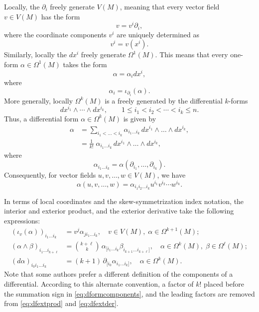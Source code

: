 \documentclass[12pt]{article}
\begin{document}
Locally, the $\partial_i$ freely generate $V(M)$, meaning
that every vector field $v\in V(M)$ has the form
\[ v= v^i \partial_i, \]
where the coordinate components $v^i$ are uniquely determined as
\[ v^i=v(x^i). \]
Similarly, locally the $dx^i$ freely generate $\Omega^1(M)$.  This
means that 
every
one-form $\alpha\in\Omega^1(M)$ takes the form
\[\alpha=\alpha_i dx^i,\]
where
\[\alpha_i=\iota_{\partial_i} (\alpha).\]
More generally, locally $\Omega^k(M)$ is a freely generated by the
differential $k$-forms
\[dx^{i_1}\wedge\cdots\wedge dx^{i_k},\qquad 1\leq
i_1<i_2<\cdots<i_k\leq n.\] Thus, a differential form $\alpha\in
\Omega^k(M)$ is given by
\begin{align}
  \label{eq:dformcomponents}
  \alpha &= \!\!\!\sum_{i_1< \ldots< i_k} \!\!\!\alpha_{i_1\ldots
    i_k}\, d x^{i_1} \wedge\ldots\wedge d x^ {i_k},\\ \nonumber
  &= \frac{1}{k!} \; \alpha_{i_1\ldots
    i_k}\, d x^{i_1} \wedge\ldots\wedge d x^ {i_k},
\end{align}
where
\[ \alpha_{i_1\dots i_k} = \alpha(\partial_{i_1},\dots,
\partial_{i_k}).\] Consequently, for vector fields $u,v,\dots, w\in
V(M)$, we have
\[ \alpha(u,v,\dots,w)  = \alpha_{i_1i_2\dots i_k} u^{i_1} v^{i_2}\cdots w^{i_k}.\]

In terms of local coordinates and the skew-symmetrization index
notation, the interior and exterior product, and the exterior
derivative take the following expressions:
\begin{align}
  (\iota_v (\alpha))_{i_1\dots i_k} &= v^j
  \alpha_{j i_1\dots i_k},\quad v\in V(M),\; \alpha\in\Omega^{k+1}(M);\\
  \label{eq:dfextprod}
  (\alpha\wedge\beta)_{i_1\dots i_{k+\ell}} &= \binom{k+\ell}{k}\,
  \alpha_{[i_1\dots i_k} \beta_{i_{k+1}\dots i_{k+\ell}]},\quad
  \alpha\in\Omega^k(M),\; \beta\in\Omega^\ell(M);\\
  \label{eq:dfextder}
  (d\alpha)_{i_0i_1\dots i_k} &= (k+1) \,\partial_{[i_0} \alpha_{i_1\dots
    i_k]},\quad \alpha\in\Omega^k(M).
\end{align}
Note that some authors prefer a different definition of the components
of a differential.  According to this alternate convention, a factor
of $k!$ placed before the summation sign in
\eqref{eq:dformcomponents}, and the leading factors are removed from
\eqref{eq:dfextprod} and \eqref{eq:dfextder}.
\end{document}
